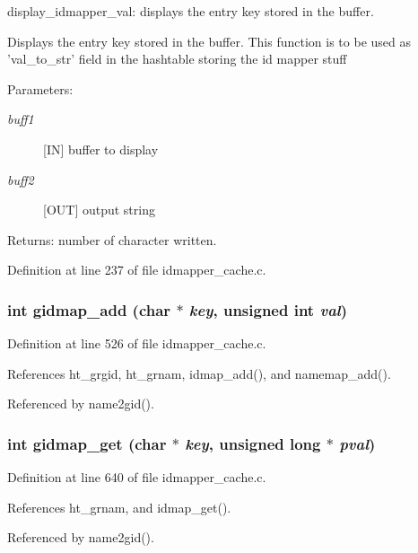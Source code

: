 display\_\-idmapper\_\-val: displays the entry key stored in the buffer.

Displays the entry key stored in the buffer. This function is to be used as 'val\_\-to\_\-str' field in the hashtable storing the id mapper stuff

\begin{Desc}
\item[Parameters:]
\begin{description}
\item[{\em buff1}][IN] buffer to display \item[{\em buff2}][OUT] output string\end{description}
\end{Desc}
\begin{Desc}
\item[Returns:]number of character written. \end{Desc}


Definition at line 237 of file idmapper\_\-cache.c.
\subsubsection{\setlength{\rightskip}{0pt plus 5cm}int gidmap\_\-add (char $\ast$ {\em key}, unsigned int {\em val})}\label{idmapper__cache_8c_a23}




Definition at line 526 of file idmapper\_\-cache.c.

References ht\_\-grgid, ht\_\-grnam, idmap\_\-add(), and namemap\_\-add().

Referenced by name2gid().
\subsubsection{\setlength{\rightskip}{0pt plus 5cm}int gidmap\_\-get (char $\ast$ {\em key}, unsigned long $\ast$ {\em pval})}\label{idmapper__cache_8c_a29}




Definition at line 640 of file idmapper\_\-cache.c.

References ht\_\-grnam, and idmap\_\-get().

Referenced by name2gid().
